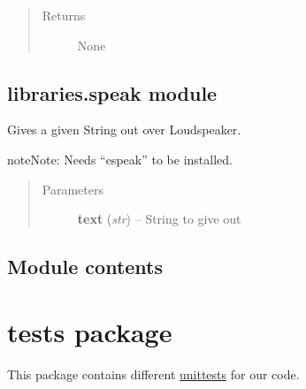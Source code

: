 \documentclass[letterpaper,10pt,english]{sphinxmanual}
\begin{document}
\begin{fulllineitems}
\begin{fulllineitems}
\begin{quote}
\begin{description}
\item[{Returns}] \leavevmode
None

\end{description}\end{quote}

\end{fulllineitems}


\end{fulllineitems}



\section{libraries.speak module}
\label{libraries:module-libraries.speak}\label{libraries:libraries-speak-module}

\begin{fulllineitems}
\label{libraries:libraries.speak.speak}
Gives a given String out over Loudspeaker.

\begin{notice}{note}{Note:}
Needs ``espeak'' to be installed.
\end{notice}
\begin{quote}\begin{description}
\item[{Parameters}] \leavevmode
\textbf{text} (\emph{str}) -- String to give out

\end{description}\end{quote}

\end{fulllineitems}



\section{Module contents}
\label{libraries:module-libraries}\label{libraries:module-contents}

\chapter{tests package}
\label{tests:tests-package}\label{tests::doc}
This package contains different \href{https://docs.python.org/3/library/unittest.html}{unittests} for our code.
\end{document}
